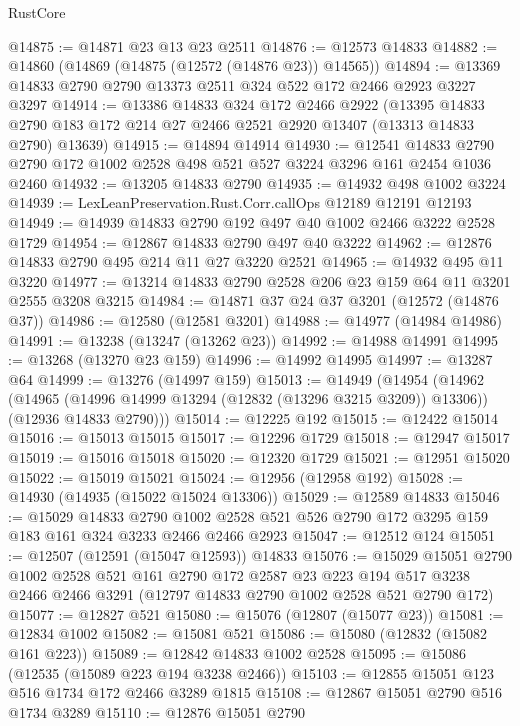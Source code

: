 \begin{lexlean}{RustCore}
\begin{coremodule}
@14875 := @14871 @23 @13 @23 @2511
@14876 := @12573 @14833
@14882 := @14860 (@14869 (@14875 (@12572 (@14876 @23)) @14565))
@14894 := @13369 @14833 @2790 @2790 @13373 @2511 @324 @522 @172 @2466 @2923 @3227 @3297
@14914 := @13386
    @14833
    @324
    @172
    @2466
    @2922
    (@13395 @14833 @2790 @183 @172 @214 @27 @2466 @2521 @2920 @13407 (@13313 @14833 @2790) @13639)
@14915 := @14894 @14914
@14930 := @12541
    @14833
    @2790
    @2790
    @172
    @1002
    @2528
    @498
    @521
    @527
    @3224
    @3296
    @161
    @2454
    @1036
    @2460
@14932 := @13205 @14833 @2790
@14935 := @14932 @498 @1002 @3224
@14939 := LexLeanPreservation.Rust.Corr.callOps @12189 @12191 @12193
@14949 := @14939 @14833 @2790 @192 @497 @40 @1002 @2466 @3222 @2528 @1729
@14954 := @12867 @14833 @2790 @497 @40 @3222
@14962 := @12876 @14833 @2790 @495 @214 @11 @27 @3220 @2521
@14965 := @14932 @495 @11 @3220
@14977 := @13214 @14833 @2790 @2528 @206 @23 @159 @64 @11 @3201 @2555 @3208 @3215
@14984 := @14871 @37 @24 @37 @3201 (@12572 (@14876 @37))
@14986 := @12580 (@12581 @3201)
@14988 := @14977 (@14984 @14986)
@14991 := @13238 (@13247 (@13262 @23))
@14992 := @14988 @14991
@14995 := @13268 (@13270 @23 @159)
@14996 := @14992 @14995
@14997 := @13287 @64
@14999 := @13276 (@14997 @159)
@15013 := @14949
    (@14954
      (@14962
        (@14965 (@14996 @14999 @13294 (@12832 (@13296 @3215 @3209)) @13306))
        (@12936 @14833 @2790)))
@15014 := @12225 @192
@15015 := @12422 @15014
@15016 := @15013 @15015
@15017 := @12296 @1729
@15018 := @12947 @15017
@15019 := @15016 @15018
@15020 := @12320 @1729
@15021 := @12951 @15020
@15022 := @15019 @15021
@15024 := @12956 (@12958 @192)
@15028 := @14930 (@14935 (@15022 @15024 @13306))
@15029 := @12589 @14833
@15046 := @15029
    @14833
    @2790
    @1002
    @2528
    @521
    @526
    @2790
    @172
    @3295
    @159
    @183
    @161
    @324
    @3233
    @2466
    @2466
    @2923
@15047 := @12512 @124
@15051 := @12507 (@12591 (@15047 @12593)) @14833
@15076 := @15029
    @15051
    @2790
    @1002
    @2528
    @521
    @161
    @2790
    @172
    @2587
    @23
    @223
    @194
    @517
    @3238
    @2466
    @2466
    @3291
    (@12797 @14833 @2790 @1002 @2528 @521 @2790 @172)
@15077 := @12827 @521
@15080 := @15076 (@12807 (@15077 @23))
@15081 := @12834 @1002
@15082 := @15081 @521
@15086 := @15080 (@12832 (@15082 @161 @223))
@15089 := @12842 @14833 @1002 @2528
@15095 := @15086 (@12535 (@15089 @223 @194 @3238 @2466))
@15103 := @12855 @15051 @123 @516 @1734 @172 @2466 @3289 @1815
@15108 := @12867 @15051 @2790 @516 @1734 @3289
@15110 := @12876 @15051 @2790

\end{coremodule}
\end{lexlean}
